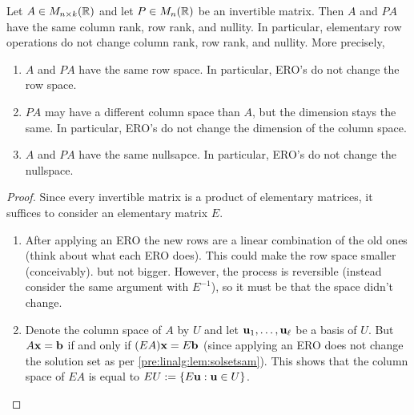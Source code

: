\documentclass[10pt, a4paper]{article}
\begin{document}
\begin{proposition}\label{pre_linalg_prop_invmatrsameranksandnul}
    Let $A \in M_{n \times k}(\mathbb{R})$ and let $P \in M_{n}(\mathbb{R})$ be an invertible matrix.
    Then $A$ and $PA$ have the same column rank,
    row rank,
    and nullity.
    In particular,
    elementary row operations do not change column rank,
    row rank,
    and nullity.
    More precisely,
    \begin{enumerate}
        \item $A$ and $PA$ have the same row space.
        In particular,
        ERO's do not change the row space.
        \item $PA$ may have a different column space than $A$,
        but the dimension stays the same.
        In particular,
        ERO's do not change the dimension of the column space.
        \item $A$ and $PA$ have the same nullsapce.
        In particular,
        ERO's do not change the nullspace.
    \end{enumerate}

    \begin{proof}
        Since every invertible matrix is a product of elementary matrices,
        it suffices to consider an elementary matrix $E$.
        \begin{enumerate}[label = (\roman*)]
            \item After applying an ERO the new rows are a linear combination of the old ones
            (think about what each ERO does).
            This could make the row space smaller
            (conceivably).
            but not bigger.
            However,
            the process is reversible
            (instead consider the same argument with $E ^ {-1}$),
            so it must be that the space didn't change.
            \item Denote the column space of $A$ by $U$ and let $\mathbf{u}_1, \dotsc, \mathbf{u}_{\ell}$ be a basis of $U$.
            But $A\mathbf{x} = \mathbf{b}$ if and only if $(EA)\mathbf{x} = E\mathbf{b}$
            (since applying an ERO does not change the solution set as per \autoref{pre:linalg:lem:solsetsam}).
            This shows that the column space of $EA$ is equal to $EU := \{E\mathbf{u} : \mathbf{u} \in U\}$.


\end{enumerate}
\end{proof}
\end{proposition}
\end{document}
